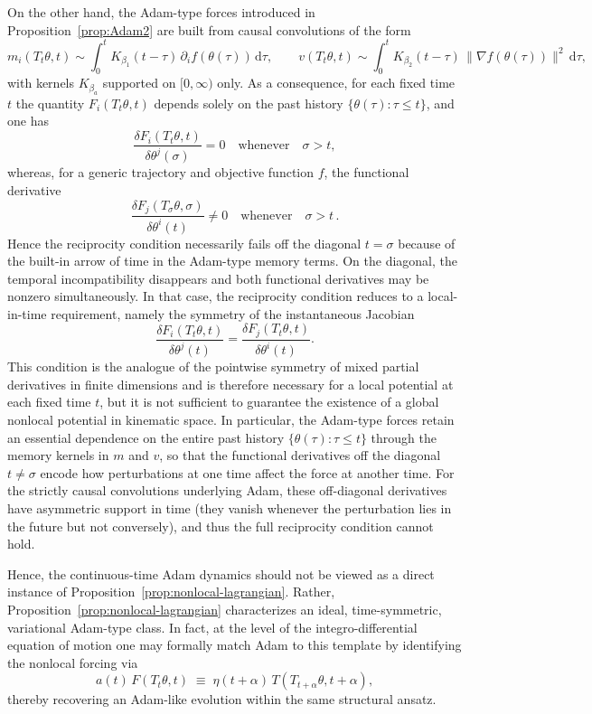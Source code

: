 \documentclass{article} %
\begin{document}
On the other hand, the Adam-type forces introduced in Proposition~\ref{prop:Adam2} are built from causal convolutions of the form
\[
m_i(T_t\theta,t) \sim  \int_0^t K_{\beta_1}(t-\tau)\,\partial_i f(\theta(\tau))\,\mathrm{d}\tau,
\qquad
v(T_t\theta,t)
\sim \int_0^t K_{\beta_2}(t-\tau)\,\|\nabla f(\theta(\tau))\|^2\,\mathrm{d}\tau,
\]
with kernels $K_{\beta_a}$ supported on $[0,\infty)$ only. As a consequence, for each fixed time $t$ the quantity $F_i(T_t\theta,t)$ depends solely on the past history
$\{\theta(\tau):\tau\le t\}$, and one has
\[
\frac{\delta F_i(T_t\theta,t)}{\delta\theta^j(\sigma)} = 0
\quad\text{whenever}\quad \sigma>t,
\]
whereas, for a generic trajectory and objective function $f$, the functional derivative
\[
\frac{\delta F_j(T_\sigma\theta,\sigma)}{\delta\theta^i(t)} \neq 0 \quad\text{whenever}\quad \sigma>t\,.
\]
Hence the reciprocity condition necessarily fails off the diagonal $t=\sigma$ because of the built-in arrow of time in the Adam-type memory terms. On the diagonal, the temporal incompatibility disappears and both functional derivatives may be nonzero simultaneously. In that case, the reciprocity condition reduces to a local-in-time requirement, namely the symmetry of the instantaneous Jacobian
\[
\frac{\delta F_i(T_t\theta,t)}{\delta\theta^j(t)}
=
\frac{\delta F_j(T_t\theta,t)}{\delta\theta^i(t)}.
\]
This condition is the analogue of the pointwise symmetry of mixed partial derivatives in finite dimensions and is therefore necessary for a local potential at each fixed time $t$, but it is not sufficient to guarantee the existence of a global nonlocal potential in kinematic space. In particular, the Adam-type forces retain an essential dependence on the entire past history $\{\theta(\tau):\tau\le t\}$ through the memory kernels in $m$ and $v$, so that the functional derivatives off the diagonal $t\neq\sigma$ encode how perturbations at one time affect the force at another time. For the strictly causal convolutions underlying Adam, these off-diagonal derivatives have asymmetric support in time (they vanish whenever the perturbation lies in the future but not conversely), and thus the full reciprocity condition cannot hold. 

Hence, the continuous-time Adam dynamics should not be viewed as a direct instance of Proposition~\ref{prop:nonlocal-lagrangian}. Rather, Proposition~\ref{prop:nonlocal-lagrangian} characterizes an ideal, time-symmetric, variational Adam-type class. In fact, at the level of the integro-differential equation of motion one may formally match Adam to this template by identifying the nonlocal forcing via
\[
a(t)\,F(T_t\theta,t)\;\equiv\;\eta(t+\alpha)\,T(T_{t+\alpha}\theta,t+\alpha),
\]
thereby recovering an Adam-like evolution within the same structural ansatz.
\end{document}
